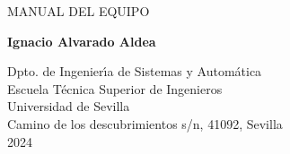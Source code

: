 

\vspace{10cm}

\begin{Huge}
\begin{center}
MANUAL DEL EQUIPO\\[1cm]
\end{center}
\end{Huge}
\begin{center}

\begin{figure}[htbp!] 
\end{figure}






\begin{large}
\vspace{0.8cm} {\bf Ignacio Alvarado Aldea}\\
\end{large}
%
\vspace{0.4cm} Dpto. de Ingenier\'{\i}a de Sistemas y Autom\'{a}tica\\
%
\vspace{0.4cm} Escuela T\'{e}cnica Superior de Ingenieros\\
%
\vspace{0.4cm} Universidad de Sevilla\\
%
\vspace{0.4cm} Camino de los descubrimientos s/n, 41092, Sevilla\\
%
\vspace{0.4cm} 2024
\vspace{5cm}





\end{center}
